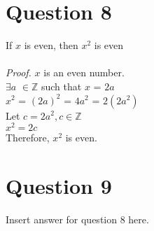\documentclass{article}
\newcommand{\Z}{\mathbb{Z}}
\begin{document}
    \section*{Question 8}
    If $x$ is even, then $x^2$ is even \\ \\
    \emph{Proof.} $x$ is an even number.\\
    $\exists a$ $\in\Z$ such that $x$ = $2a$ \\
    $x^2$ = $(2a)^2$ = $4a^2$ = $2(2a^2)$ \\
    Let $c = 2a^2, c\in\Z$ \\
    $x^2 = 2c$ \\
    Therefore, $x^2$ is even.
    
     \section*{Question 9}
    Insert answer for question 8 here.
       
\end{document}
